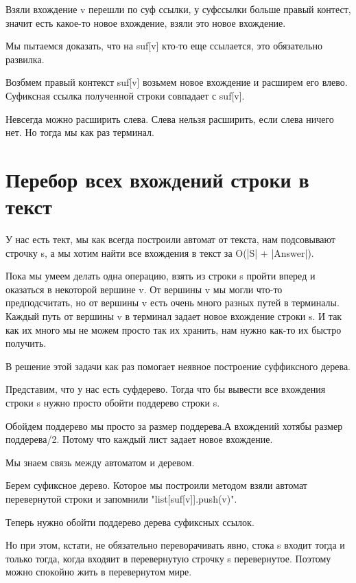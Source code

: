 \begin{description}
    Взяли вхождение v перешли по суф ссылки, 
    у суфссылки больше правый контест, значит 
    есть какое-то новое вхождение, взяли это новое вхождение. 

    Мы пытаемся доказать, что на suf[v] кто-то еще ссылается, 
    это обязательно развилка. 

    Возбмем правый контекст suf[v] возьмем новое вхождение 
    и расширем его влево. Суфиксная ссылка полученной строки 
    совпадает с suf[v].

    Невсегда можно расширить слева. Слева нельзя расширить, 
    если слева ничего нет. Но тогда мы как раз терминал. 
    \end{description}

\section{Перебор всех вхождений строки в текст}

У нас есть тект, мы как всегда построили автомат от текста, 
нам подсовывают строчку s, а мы  хотим найти все 
вхождения в текст за O(|S| + |Answer|). 

Пока мы умеем делать одна операцию, взять из строки s пройти 
вперед и оказаться в некоторой вершине v. От вершины v мы
могли что-то предподсчитать, но от
вершины v есть очень много разных путей в терминалы. Каждый
путь от вершины v в терминал задает новое вхождение строки s.
И так как их много мы не можем просто так их
хранить, нам нужно как-то их быстро получить.   

В решение этой задачи как раз помогает неявное построение суффиксного дерева.

Представим, что у нас есть суфдерево. Тогда что бы вывести 
все вхождения строки s нужно просто обойти поддерево строки s.

Обойдем поддерево мы просто за размер поддерева.А вхождений
хотябы размер поддерева/2. Потому что каждый лист задает новое
вхождение.

Мы знаем связь между автоматом и деревом.    

Берем суфиксное дерево. Которое мы построили методом взяли автомат
перевернутой строки и запомнили \cpp"list[suf[v]].push(v)".  

Теперь нужно обойти поддерево дерева суфиксных ссылок. 

Но при этом, кстати, не обязательно переворачивать явно, 
стока s входит тогда и только тогда, когда 
входяит в перевернутую строчку s перевернутое. Поэтому 
можно спокойно жить в перевернутом мире.

 
